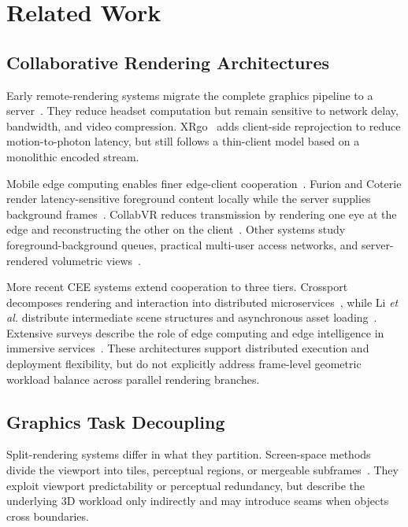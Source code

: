 \documentclass[10pt,journal,compsoc]{IEEEtran}
\begin{document}
\section{Related Work}
\label{sec:related_work}

\subsection{Collaborative Rendering Architectures}

Early remote-rendering systems migrate the complete graphics pipeline to a server~\cite{shea_cloud_2013,cai_survey_2016,zhao_virtual_2021}. They reduce headset computation but remain sensitive to network delay, bandwidth, and video compression. XRgo~\cite{gao_xrgo_2025} adds client-side reprojection to reduce motion-to-photon latency, but still follows a thin-client model based on a monolithic encoded stream.

Mobile edge computing enables finer edge-client cooperation~\cite{shi_edge_2016,mach_mobile_2017}. Furion and Coterie render latency-sensitive foreground content locally while the server supplies background frames~\cite{lai_furion_2020,meng_coterie_2020}. CollabVR reduces transmission by rendering one eye at the edge and reconstructing the other on the client~\cite{ke_collabvr_2023}. Other systems study foreground-background queues, practical multi-user access networks, and server-rendered volumetric views~\cite{xu_wireless_2025,yeregui_edge_2024,gul_cloud_2020,son_split_2020}.

More recent CEE systems extend cooperation to three tiers. Crossport decomposes rendering and interaction into distributed microservices~\cite{su_crossport_2026}, while Li \emph{et al.} distribute intermediate scene structures and asynchronous asset loading~\cite{li_toward_2024}. Extensive surveys describe the role of edge computing and edge intelligence in immersive services~\cite{xu_edge_2023,tang_systematic_2023}. These architectures support distributed execution and deployment flexibility, but do not explicitly address frame-level geometric workload balance across parallel rendering branches.

\subsection{Graphics Task Decoupling}

Split-rendering systems differ in what they partition. Screen-space methods divide the viewport into tiles, perceptual regions, or mergeable subframes~\cite{corbillon_viewport-adaptive_2017,cantory_image-space_2023}. They exploit viewport predictability or perceptual redundancy, but describe the underlying 3D workload only indirectly and may introduce seams when objects cross boundaries.
\end{document}
